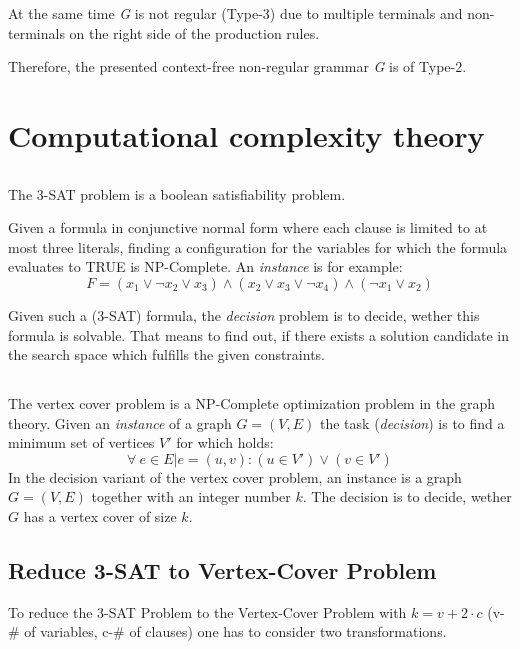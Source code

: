 \documentclass[11pt]{article}
\begin{document}
At the same time \emph{G} is not regular (Type-3) due to multiple terminals and non-terminals on the right side of the production rules.

Therefore, the presented context-free non-regular grammar \emph{G} is of Type-2.

\section{Computational complexity theory}
\subsection{}
The 3-SAT problem is a boolean satisfiability problem. 

Given a formula in conjunctive normal form where each clause is limited to at most three literals, finding a configuration for the variables for which the formula evaluates to TRUE is NP-Complete. An \emph{instance} is for example:
\begin{equation*}
	F=(x_1 \lor \lnot x_2\lor x_3)\land(x_2\lor x_3 \lor \lnot x_4)\land(\lnot x_1 \lor x_2)
\end{equation*}

Given such a (3-SAT) formula, the \emph{decision} problem is to decide, wether this formula is solvable. That means to find out, if there exists a solution candidate in the search space which fulfills the given constraints.

\subsection{}
The vertex cover problem is a NP-Complete optimization problem in the graph theory. Given an \emph{instance} of a graph  $G=(V,E)$ the task (\emph{decision}) is to find a minimum set of vertices $V'$ for which holds:
\begin{equation*}
	\forall \: e \in E| e=(u,v):(u\in V')\lor (v \in V')
\end{equation*}
In the decision variant of the vertex cover problem, an instance is a graph $G=(V,E)$ together with an integer number $k$. The decision is to decide, wether $G$ has a vertex cover of size $k$. 
\subsection{Reduce 3-SAT to Vertex-Cover Problem}
To reduce the 3-SAT Problem to the Vertex-Cover Problem with $k=v+2\cdot c$ (v-\# of variables, c-\# of clauses) one has to consider two transformations.
\end{document}

